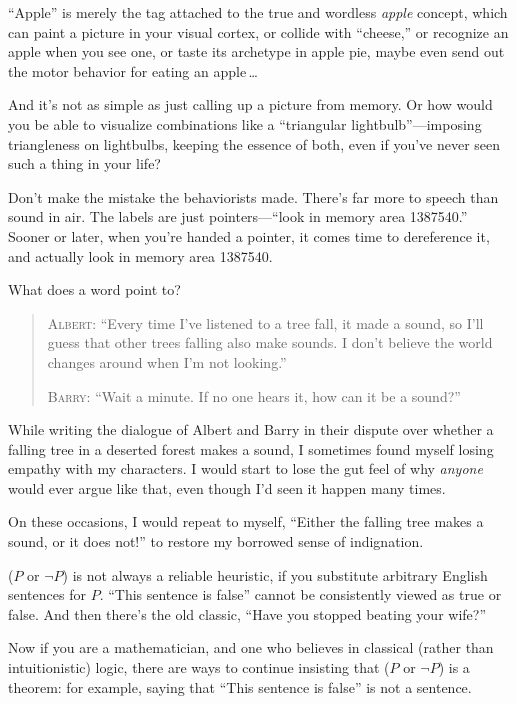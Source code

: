 {{{
 ``Apple'' is merely the tag
attached to the true and wordless \textit{apple} concept, which can
paint a picture in your visual cortex, or collide with
``cheese,'' or recognize an apple
when you see one, or taste its archetype in apple pie, maybe even send
out the motor behavior for eating an apple\,\ldots}

{
 And it's not as simple as just calling up a
picture from memory. Or how would you be able to visualize combinations
like a ``triangular
lightbulb''---imposing triangleness on lightbulbs,
keeping the essence of both, even if you've never seen
such a thing in your life?}

{
 Don't make the mistake the behaviorists made.
There's far more to speech than sound in air. The
labels are just pointers---``look in memory area
1387540.'' Sooner or later, when
you're handed a pointer, it comes time to dereference
it, and actually look in memory area 1387540.}

{
 What does a word point to?}

\myendsectiontext


\bigskip


\begin{quotation}
{
 \textsc{Albert}: ``Every time I've
listened to a tree fall, it made a sound, so I'll guess
that other trees falling also make sounds. I don't
believe the world changes around when I'm not
looking.''}

{
 \textsc{Barry}: ``Wait a minute. If no one hears it, how
 can it be a sound?''}
\end{quotation}

{
 While writing the dialogue of Albert and Barry in their dispute
over whether a falling tree in a deserted forest makes a sound, I
sometimes found myself losing empathy with my characters. I would start
to lose the gut feel of why \textit{anyone} would ever argue like that,
even though I'd seen it happen many times.}

{
 On these occasions, I would repeat to myself,
``Either the falling tree makes a sound, or it does
not!'' to restore my borrowed sense of indignation.}

{
 ($P$ or $\lnot P$) is not always a reliable heuristic, if you
substitute arbitrary English sentences for $P$. ``This
sentence is false'' cannot be consistently viewed as
true or false. And then there's the old classic,
``Have you stopped beating your
wife?''}

{
 Now if you are a mathematician, and one who believes in classical
(rather than intuitionistic) logic, there are ways to continue
insisting that ($P$ or $\lnot P$) is a theorem: for example, saying
that ``This sentence is false'' is
not a sentence.}

}}
